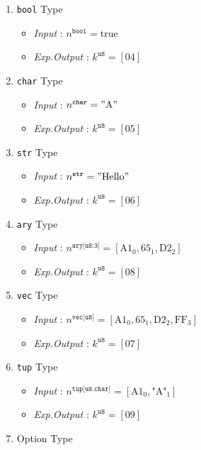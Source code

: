 \documentclass[../alan-handbook.tex]{subfiles}
\begin{document}
\begin{enumerate}
    \item \texttt{bool} Type
        \begin{itemize}
            \item \textit{Input} : $n^{\texttt{bool}} = \text{true}$
            \item \textit{Exp.Output} : $k^{\texttt{u8}} = [\text{04}]$
        \end{itemize}
    \item \texttt{char} Type
        \begin{itemize}
            \item \textit{Input} : $n^{\texttt{char}} = "\text{A}"$
            \item \textit{Exp.Output} : $k^{\texttt{u8}} = [\text{05}]$
        \end{itemize}
    \item \texttt{str} Type
        \begin{itemize}
            \item \textit{Input} : $n^{\texttt{str}} = "\text{Hello}" $
            \item \textit{Exp.Output} : $k^{\texttt{u8}} = [\text{06}]$
        \end{itemize}
    \item \texttt{ary} Type
        \begin{itemize}
            \item \textit{Input} : $n^{\texttt{ary[u8:3]}} = [\text{A1}_0,\text{65}_1,\text{D2}_2] $
            \item \textit{Exp.Output} : $k^{\texttt{u8}} = [\text{08}]$
        \end{itemize}
    \item \texttt{vec} Type
        \begin{itemize}
            \item \textit{Input} : $n^{\texttt{vec[u8]}} = [\text{A1}_0,\text{65}_1,\text{D2}_2,\text{FF}_3] $
            \item \textit{Exp.Output} : $k^{\texttt{u8}} = [\text{07}]$
        \end{itemize}
    \item \texttt{tup} Type
        \begin{itemize}
            \item \textit{Input} : $n^{\texttt{tup[u8,char]}} = [\text{A1}_0,\text{"A"}_1] $
            \item \textit{Exp.Output} : $k^{\texttt{u8}} = [\text{09}]$
        \end{itemize}
    \item Option Type

\end{enumerate}
\end{document}
